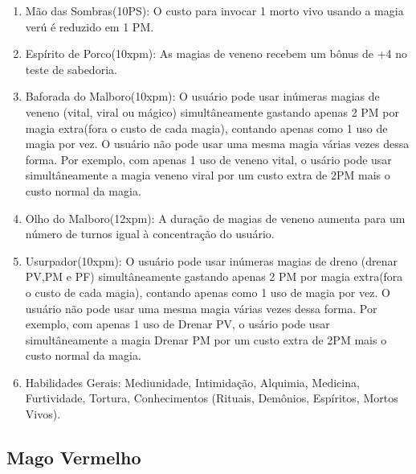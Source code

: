 \begin{enumerate}
	\item Mão das Sombras(10PS): O custo para invocar 1 morto vivo usando a magia verú é reduzido em 1 PM.
 

\item Espírito de Porco(10xpm): As magias de veneno recebem um bônus de +4 no teste de sabedoria. 

  	\item Baforada do Malboro(10xpm): O usuário pode usar inúmeras magias de veneno (vital, viral ou mágico) simultâneamente gastando apenas 2 PM por magia extra(fora o custo de cada magia), contando apenas como 1 uso de magia por vez. O usuário não pode usar uma mesma magia várias vezes dessa forma. Por exemplo, com apenas 1 uso de veneno vital, o usário pode usar simultâneamente a magia veneno viral por um custo extra de 2PM mais o custo normal da magia.

  	\item Olho do Malboro(12xpm): A duração de magias de veneno aumenta para um número de turnos igual à concentração do usuário.

		\item Usurpador(10xpm): O usuário pode usar inúmeras magias de dreno (drenar PV,PM e PF) simultâneamente gastando apenas 2 PM por magia extra(fora o custo de cada magia), contando apenas como 1 uso de magia por vez. O usuário não pode usar uma mesma magia várias vezes dessa forma. Por exemplo, com apenas 1 uso de Drenar PV, o usário pode usar simultâneamente a magia Drenar PM por um custo extra de 2PM mais o custo normal da magia.

  
  \item Habilidades Gerais: Mediunidade, Intimidação, Alquimia, Medicina, Furtividade, Tortura, Conhecimentos (Rituais, Demônios, Espíritos, Mortos Vivos).
\end{enumerate}
  
  \subsection{Mago Vermelho}    
  	
